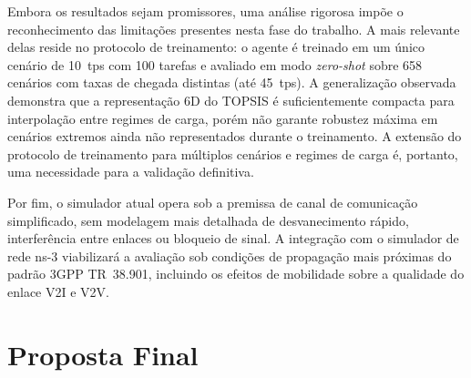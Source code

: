 Embora os resultados sejam promissores, uma análise rigorosa impõe o reconhecimento das limitações presentes nesta fase do trabalho. A mais relevante delas reside no protocolo de treinamento: o agente é treinado em um único cenário de 10~tps com 100 tarefas e avaliado em modo \textit{zero-shot} sobre 658 cenários com taxas de chegada distintas (até 45~tps). A generalização observada demonstra que a representação 6D do \gls{TOPSIS} é suficientemente compacta para interpolação entre regimes de carga, porém não garante robustez máxima em cenários extremos ainda não representados durante o treinamento. A extensão do protocolo de treinamento para múltiplos cenários e regimes de carga é, portanto, uma necessidade para a validação definitiva.



Por fim, o simulador atual opera sob a premissa de canal de comunicação simplificado, sem modelagem mais detalhada de desvanecimento rápido, interferência entre enlaces ou bloqueio de sinal. A integração com o simulador de rede ns-3 viabilizará a avaliação sob condições de propagação mais próximas do padrão \gls{3GPP} TR~38.901, incluindo os efeitos de mobilidade sobre a qualidade do enlace \gls{V2I} e \gls{V2V}.

\section{Proposta Final}
\label{sec:proposta-final}

